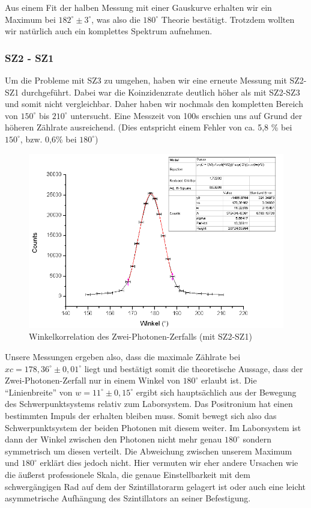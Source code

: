 Aus einem Fit der halben Messung mit einer Gauskurve erhalten wir ein Maximum bei $182^\circ \pm 3^\circ$, was also die $180^\circ$ Theorie bestätigt. Trotzdem wollten wir natürlich auch ein komplettes Spektrum aufnehmen.

\subsubsection{SZ2 - SZ1}

Um die Probleme mit SZ3 zu umgehen, haben wir eine erneute Messung mit SZ2-SZ1 durchgeführt. Dabei war die Koinzidenzrate deutlich höher als mit SZ2-SZ3 und somit nicht vergleichbar. Daher haben wir nochmals den kompletten Bereich von $150^\circ$ bis $210^\circ$ untersucht. Eine Messzeit von 100s erschien uns auf Grund der höheren Zählrate ausreichend. (Dies entspricht einem Fehler von ca. 5,8 \% bei $150^\circ$, bzw. 0,6\% bei $180^\circ$)

\begin{figure}[H]
 \includegraphics[width=\textwidth]{Graphen/180K.png}
 \caption{Winkelkorrelation des Zwei-Photonen-Zerfalls (mit SZ2-SZ1)}
\end{figure}

Unsere Messungen ergeben also, dass die maximale Zählrate bei $xc = 178,36^\circ \pm 0,01^\circ$ liegt und bestätigt somit die theoretische Aussage, dass der Zwei-Photonen-Zerfall nur in einem Winkel von $180^\circ$ erlaubt ist. Die "`Linienbreite"' von $w = 11^\circ \pm 0,15^\circ$ ergibt sich hauptsächlich aus der Bewegung des Schwerpunktsystems relativ zum Laborsystem. Das Positronium hat einen bestimmten Impuls der erhalten bleiben muss. Somit bewegt sich also das Schwerpunktsystem der beiden Photonen mit diesem weiter. Im Laborsystem ist dann der Winkel zwischen den Photonen nicht mehr genau $180^\circ$ sondern symmetrisch um diesen verteilt. Die Abweichung zwischen unserem Maximum und $180^\circ$ erklärt dies jedoch nicht. Hier vermuten wir eher andere Ursachen wie die äußerst professionele Skala, die genaue Einstellbarkeit mit dem schwergängigen Rad auf dem der Szintillatorarm gelagert ist oder auch eine leicht asymmetrische Aufhängung des Szintillators an seiner Befestigung.

